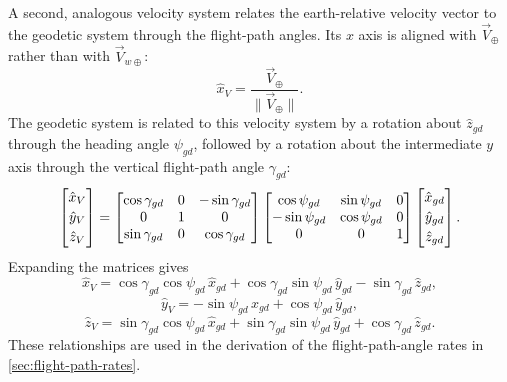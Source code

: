 A second, analogous velocity system relates the earth-relative velocity vector to
the geodetic system through the flight-path angles. Its $x$ axis is aligned with
$\vec V_{\oplus}$ rather than with $\vec V_{w\oplus}$:
\begin{equation}
  \hat x_V=\frac{\vec V_{\oplus}}
  {\lVert\vec V_{\oplus}\rVert}.
  \label{eq:earth-relative-velocity-x-axis}
\end{equation}
The geodetic system is related to this velocity system by a rotation about
$\hat z_{gd}$ through the heading angle $\psi_{gd}$, followed by a rotation about
the intermediate $y$ axis through the vertical flight-path angle $\gamma_{gd}$:
\begin{equation}
  \begin{bmatrix}
    \hat x_V\\[0.2em]
    \hat y_V\\[0.2em]
    \hat z_V
  \end{bmatrix}
  =
  \begin{bmatrix} \cos \gamma_{gd} & 0 & -\sin \gamma_{gd} \\ 0 & 1 & 0 \\ \sin \gamma_{gd} & 0 & \cos \gamma_{gd} \end{bmatrix}
  \begin{bmatrix} \cos \psi_{gd} & \sin \psi_{gd} & 0 \\ -\sin \psi_{gd} & \cos \psi_{gd} & 0 \\ 0 & 0 & 1 \end{bmatrix}
  \begin{bmatrix}
    \hat x_{gd}\\[0.2em]
    \hat y_{gd}\\[0.2em]
    \hat z_{gd}
  \end{bmatrix}.
  \label{eq:geodetic-to-velocity-transformation}
\end{equation}
Expanding the matrices gives
\begin{equation}
  \hat x_V
  =\cos\gamma_{gd}\cos\psi_{gd}\,\hat x_{gd}
  +\cos\gamma_{gd}\sin\psi_{gd}\,\hat y_{gd}
  -\sin\gamma_{gd}\,\hat z_{gd},
  \label{eq:velocity-x-from-geodetic}
\end{equation}
\begin{equation}
  \hat y_V
  =-\sin\psi_{gd}\,\hat x_{gd}
  +\cos\psi_{gd}\,\hat y_{gd},
  \label{eq:velocity-y-from-geodetic}
\end{equation}
\begin{equation}
  \hat z_V
  =\sin\gamma_{gd}\cos\psi_{gd}\,\hat x_{gd}
  +\sin\gamma_{gd}\sin\psi_{gd}\,\hat y_{gd}
  +\cos\gamma_{gd}\,\hat z_{gd}.
  \label{eq:velocity-z-from-geodetic}
\end{equation}
These relationships are used in the derivation of the flight-path-angle rates in
\cref{sec:flight-path-rates}.
